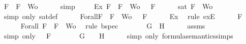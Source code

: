 \begin{isabellebody}
\ {\isachardoublequoteopen}F\ {\isasymin}\ {\isacharbraceleft}F{\isacharbraceright}\ {\isasymunion}\ Wo{\isachardoublequoteclose}\isanewline
\ \ \ \ \isamarkupfalse%
\ simp\ \isanewline
\ \ \isamarkupfalse%
\ Ex{}{\isacharcolon}{\isachardoublequoteopen}{\isasymexists}{\isasymA}{\isachardot}\ {\isasymforall}F\ {\isasymin}\ {\isacharparenleft}{\isacharbraceleft}F{\isacharbraceright}\ {\isasymunion}\ Wo{\isacharparenright}{\isachardot}\ {\isasymA}\ {\isasymTurnstile}\ F{\isachardoublequoteclose}\isanewline
\ \ \ \ \isamarkupfalse%
\ {\isacartoucheopen}sat\ {\isacharparenleft}{\isacharbraceleft}F{\isacharbraceright}\ {\isasymunion}\ Wo{\isacharparenright}{\isacartoucheclose}\ \isamarkupfalse%
\ {\isacharparenleft}simp\ only{\isacharcolon}\ sat{\isacharunderscore}def{\isacharparenright}\isanewline
\ \ \isamarkupfalse%
\ {\isasymA}\ \ Forall{}{\isacharcolon}{\isachardoublequoteopen}{\isasymforall}F\ {\isasymin}\ {\isacharparenleft}{\isacharbraceleft}F{\isacharbraceright}\ {\isasymunion}\ Wo{\isacharparenright}{\isachardot}\ {\isasymA}\ {\isasymTurnstile}\ F{\isachardoublequoteclose}\isanewline
\ \ \ \ \isamarkupfalse%
\ Ex{}\ \isamarkupfalse%
\ {\isacharparenleft}rule\ exE{\isacharparenright}\isanewline
\ \ \isamarkupfalse%
\ {\isachardoublequoteopen}{\isasymA}\ {\isasymTurnstile}\ F{\isachardoublequoteclose}\isanewline
\ \ \ \ \isamarkupfalse%
\ Forall{}\ {\isacartoucheopen}F\ {\isasymin}\ {\isacharbraceleft}F{\isacharbraceright}\ {\isasymunion}\ Wo{\isacartoucheclose}\ \isamarkupfalse%
\ {\isacharparenleft}rule\ bspec{\isacharparenright}\isanewline
\ \ \isamarkupfalse%
\ \isamarkupfalse%
\ {\isachardoublequoteopen}{\isasymA}\ {\isasymTurnstile}\ {\isacharparenleft}G\ \isactrlbold {\isasymor}\ H{\isacharparenright}{\isachardoublequoteclose}\isanewline
\ \ \ \ \isamarkupfalse%
\ assms{\isacharparenleft}{}{\isacharparenright}\ \isamarkupfalse%
\ {\isacharparenleft}simp\ only{\isacharcolon}\ {\isacartoucheopen}{\isasymA}\ {\isasymTurnstile}\ F{\isacartoucheclose}{\isacharparenright}\isanewline
\ \ \isamarkupfalse%
\ \isamarkupfalse%
\ {\isachardoublequoteopen}{\isasymA}\ {\isasymTurnstile}\ G\ {\isasymor}\ {\isasymA}\ {\isasymTurnstile}\ H{\isachardoublequoteclose}\isanewline
\ \ \ \ \isamarkupfalse%
\ {\isacharparenleft}simp\ only{\isacharcolon}\ formula{\isacharunderscore}semantics{\isachardot}simps{\isacharparenleft}{}{\isacharparenright}{\isacharparenright}\isanewline

\end{isabellebody}
